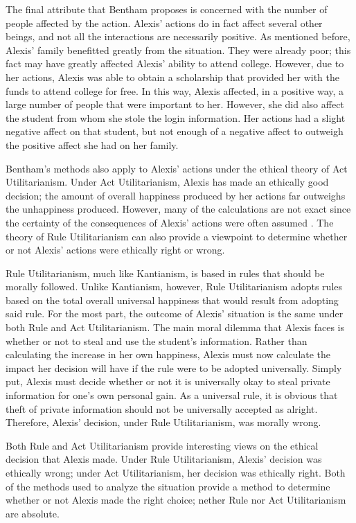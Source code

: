 \documentclass{paper}
\begin{document}
\begin{linenumbers}
The final attribute that Bentham proposes is concerned with the number of people affected by the
action. Alexis' actions do in fact affect several other beings, and not all the interactions are
necessarily positive. As mentioned before, Alexis' family benefitted greatly from the situation.
They were already poor; this fact may have greatly affected Alexis' ability to attend college.
However, due to her actions, Alexis was able to obtain a scholarship that provided her with the
funds to attend college for free. In this way, Alexis affected, in a positive way, a large number of
people that were important to her. However, she did also affect the student from whom she stole the
login information. Her actions had a slight negative affect on that student, but not enough of a
negative affect to outweigh the positive affect she had on her family.

Bentham's methods also apply to Alexis' actions under the ethical theory of Act Utilitarianism.
Under Act Utilitarianism, Alexis has made an ethically good decision; the amount of overall
happiness produced by her actions far outweighs the unhappiness produced. However, many of the
calculations are not exact since the certainty of the consequences of Alexis' actions were often
assumed \cite[77]{ethics}. The theory of Rule Utilitarianism can also provide a viewpoint to
determine whether or not Alexis' actions were ethically right or wrong.

Rule Utilitarianism, much like Kantianism, is based in rules that should be morally followed. Unlike
Kantianism, however, Rule Utilitarianism adopts rules based on the total overall universal happiness
that would result from adopting said rule. For the most part, the outcome of Alexis' situation is
the same under both Rule and Act Utilitarianism. The main moral dilemma that Alexis faces is whether
or not to steal and use the student's information. Rather than calculating the increase in her own
happiness, Alexis must now calculate the impact her decision will have if the rule were to be
adopted universally. Simply put, Alexis must decide whether or not it is universally okay to steal
private information for one's own personal gain. As a universal rule, it is obvious that theft of
private information should not be universally accepted as alright. Therefore, Alexis' decision,
under Rule Utilitarianism, was morally wrong.

Both Rule and Act Utilitarianism provide interesting views on the ethical decision that Alexis made.
Under Rule Utilitarianism, Alexis' decision was ethically wrong; under Act Utilitarianism, her
decision was ethically right. Both of the methods used to analyze the situation provide a method to
determine whether or not Alexis made the right choice; nether Rule nor Act Utilitarianism are
absolute. \end{linenumbers} \newpage \printbibliography
\end{document}
